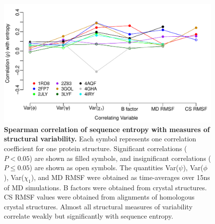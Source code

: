 \documentclass[12pt]{article}
\begin{document}
\begin{figure}[tbh]
\begin{center}
    \includegraphics[height=0.35\textheight]{cor_entropy_SF.pdf}
\end{center}
\caption{\textbf{Spearman correlation of sequence entropy with measures of structural variability.} Each symbol represents one correlation coefficient for one protein structure. Significant correlations ($P<0.05$) are shown as filled symbols, and insignificant correlations ($P\leq0.05$) are shown as open symbols. The quantities Var($\psi$), Var($\phi$), Var($\chi_1$), and MD RMSF were obtained as time-averages over 15ns of MD simulations. B factors were obtained from crystal structures. CS RMSF values were obtained from alignments of homologous crystal structures. Almost all structural measures of variability correlate weakly but significantly with sequence entropy.}
\label{fig:cor_entropy_SF}
\end{figure}
\end{document}
